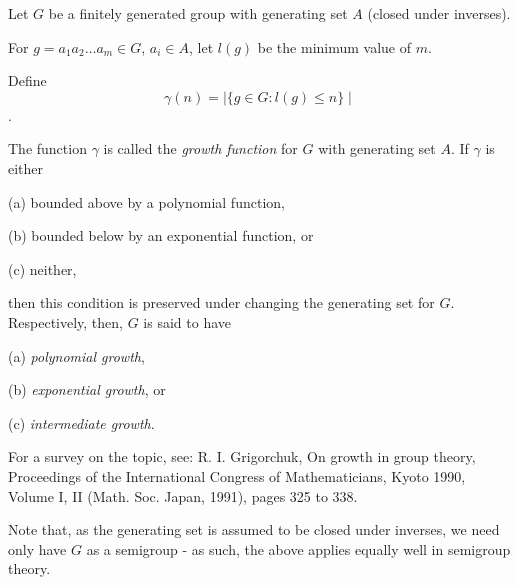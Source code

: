 \documentclass[12pt]{article}
\begin{document}
Let $G$ be a finitely generated group with generating set $A$ (closed under inverses).

For $g=a_1a_2\ldots a_m\in G$, $a_i\in A$, let $l(g)$ be the minimum value of $m$.

Define $$\gamma(n)=\mid\{g\in G:l(g)\le n\}\mid$$.

The function $\gamma$ is called the \emph{growth function} for $G$ with generating set $A$.  If $\gamma$ is either

(a) bounded above by a polynomial function,

(b) bounded below by an exponential function, or

(c) neither,

then this condition is preserved under changing the generating set for $G$.  Respectively, then, $G$ is said to have

(a) \emph{polynomial growth},

(b) \emph{exponential growth}, or

(c) \emph{intermediate growth}.


For a survey on the topic, see:
R. I. Grigorchuk, On growth in group theory, Proceedings of the
International Congress of Mathematicians, Kyoto 1990, Volume I,
II (Math. Soc. Japan, 1991), pages 325 to 338.

Note that, as the generating set is assumed to be closed under inverses, we need only have $G$ as a semigroup - as such, the above applies equally well in semigroup theory.
\end{document}

